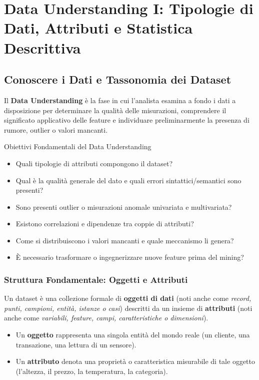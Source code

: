 \chapter{Data Understanding I: Tipologie di Dati, Attributi e Statistica Descrittiva}
\label{ch:data-understanding-types-statistics}

\FloatBarrier
\section{Conoscere i Dati e Tassonomia dei Dataset}

Il \textbf{Data Understanding} \`e la fase in cui l'analista esamina a fondo i dati a disposizione per determinare la qualit\`a delle misurazioni, comprendere il significato applicativo delle feature e individuare preliminarmente la presenza di rumore, outlier o valori mancanti.

\begin{noteblock}{Obiettivi Fondamentali del Data Understanding}
\begin{itemize}
    \item Quali tipologie di attributi compongono il dataset?
    \item Qual \`e la qualit\`a generale del dato e quali errori sintattici/semantici sono presenti?
    \item Sono presenti outlier o misurazioni anomale univariata e multivariata?
    \item Esistono correlazioni e dipendenze tra coppie di attributi?
    \item Come si distribuiscono i valori mancanti e quale meccanismo li genera?
    \item \`E necessario trasformare o ingegnerizzare nuove feature prima del mining?
\end{itemize}
\end{noteblock}

\FloatBarrier
\subsection{Struttura Fondamentale: Oggetti e Attributi}
Un dataset \`e una collezione formale di \textbf{oggetti di dati} (noti anche come \textit{record, punti, campioni, entit\`a, istanze o casi}) descritti da un insieme di \textbf{attributi} (noti anche come \textit{variabili, feature, campi, caratteristiche o dimensioni}).
\begin{itemize}
    \item Un \textbf{oggetto} rappresenta una singola entit\`a del mondo reale (un cliente, una transazione, una lettura di un sensore).
    \item Un \textbf{attributo} denota una propriet\`a o caratteristica misurabile di tale oggetto (l'altezza, il prezzo, la temperatura, la categoria).
\end{itemize}

